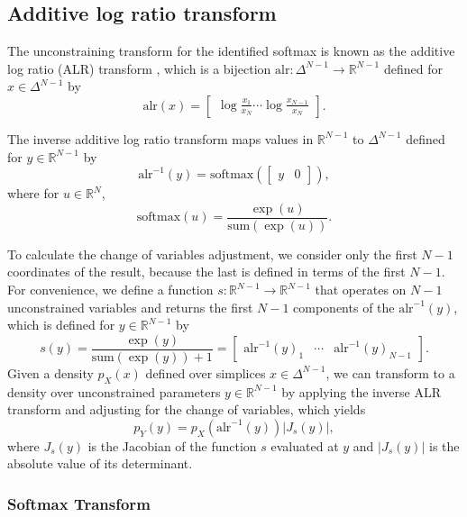 \documentclass[11pt]{article}
\newcommand{\abs}[1]{\left| #1 \right|}
\newcommand{\absdet}[1]{\abs{#1}}
\begin{document}
\subsection{Additive log ratio transform}

The unconstraining transform for the identified softmax is known as
the additive log ratio (ALR) transform
\cite{aitchison1982statistical}, which is a bijection
$\textrm{alr}:\Delta^{N-1} \rightarrow \mathbb{R}^{N-1}$ defined for
$x \in \Delta^{N-1}$ by
\[
  \textrm{alr}(x)
  = \begin{bmatrix}\displaystyle
    \log \frac{x_1}{x_N} \cdots \log \frac{x_{N-1}}{x_N}
  \end{bmatrix}.
\]

The inverse additive log ratio transform maps values in
$\mathbb{R}^{N-1}$ to $\Delta^{N-1}$ defined for $y \in
\mathbb{R}^{N-1}$ by
\[
  \textrm{alr}^{-1}(y)
  = \textrm{softmax}(\begin{bmatrix} y &  0 \end{bmatrix}),
\]
where for $u \in \mathbb{R}^N$,
\[
  \textrm{softmax}(u) = \frac{\exp(u)}{\textrm{sum}(\exp(u))}.
\]

To calculate the change of variables adjustment, we consider only the
first $N-1$ coordinates of the result, because the last is defined in
terms of the first $N-1$.  For convenience, we define a function 
$s:\mathbb{R}^{N-1} \rightarrow \mathbb{R}^{N-1}$ that operates on
$N-1$ unconstrained variables and returns the first $N-1$ components
of the $\textrm{alr}^{-1}(y)$, which is
defined for $y \in \mathbb{R}^{N-1}$ by
\[
  s(y) = \frac{\exp(y)}{\textrm{sum}(\exp(y)) + 1}
  = \begin{bmatrix}
    \textrm{alr}^{-1}(y)_1
    & \cdots &
    \textrm{alr}^{-1}(y)_{N-1}
    \end{bmatrix}.
\]
Given a density $p_X(x)$ defined over simplices $x \in \Delta^{N-1}$,
we can transform to a density over unconstrained parameters $y \in
\mathbb{R}^{N-1}$ by applying the inverse ALR transform and adjusting
for the change of variables, which yields
\[
  p_Y(y) = p_X(\textrm{alr}^{-1}(y)) \absdet{J_{s}(y)},
\]
where $J_{s}(y)$ is the Jacobian of the function $s$ evaluated at $y$
and $\absdet{J_s(y)}$ is the absolute value of its determinant.


\subsubsection{Softmax Transform}
\end{document}
